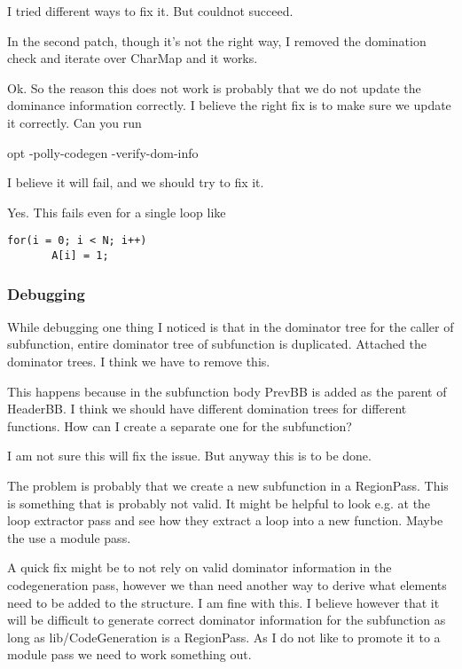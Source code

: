 \documentclass[a4paper,10pt]{article}
\begin{document}
	I tried different ways to fix it. But couldnot succeed.

	In the second patch, though it's not the right way, I removed the
	domination check and iterate over CharMap and it works.

Ok. So the reason this does not work is probably that we do not update the dominance information correctly. I believe the right fix is to make sure we update it correctly. Can you run

opt -polly-codegen -verify-dom-info

I believe it will fail, and we should try to fix it.

Yes. This fails even for a single loop like


\begin{verbatim}
for(i = 0; i < N; i++)
	   A[i] = 1;
\end{verbatim}

\subsubsection{Debugging}
While debugging one thing I noticed is that in the dominator tree for
	the caller of subfunction, entire dominator tree of subfunction is
	duplicated. Attached the dominator trees. I think we have to remove
	this.

	This happens because in the subfunction body PrevBB is added as the
	parent of HeaderBB. I think we should have different domination trees
	for different functions. How can I create a separate one for the
		subfunction?

			I am not sure this will fix the issue. But anyway this is to be done.

The problem is probably that we create a new subfunction in a RegionPass. This is something that is probably not valid. It might be helpful to look e.g. at the loop extractor pass and see how they extract a loop into a new function. Maybe the use a module pass.

A quick fix might be to not rely on valid dominator information in the codegeneration pass, however we than need another way to derive what elements need to be added to the structure.                                                                                                                                                                                                              I am fine with this. I believe however that it will be difficult to generate correct dominator information for the subfunction as long as lib/CodeGeneration is a RegionPass. As I do not like to promote it to a module pass we need to work something out.
\end{document}
